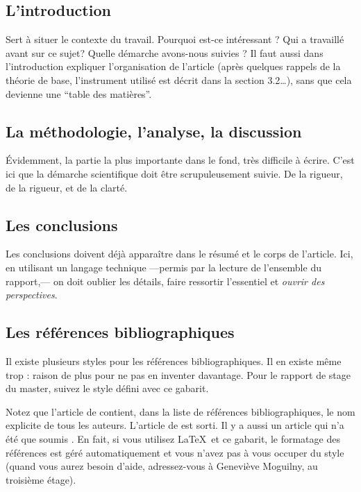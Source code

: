 \documentclass{ipgpmaster}
\begin{document}
\subsection{L'introduction}

Sert à situer le contexte du travail. Pourquoi est-ce intéressant ? 
Qui a travaillé avant sur ce sujet? Quelle démarche avons-nous suivies ?
Il faut aussi dans l'introduction expliquer l'organisation de l'article 
(après quelques rappels de la théorie de base,  l'instrument 
utilisé est décrit dans la section 3.2\dots), sans que cela 
devienne une ``table des matières''.


\subsection{La méthodologie, l'analyse, la discussion}

Évidemment, la partie la plus importante dans le fond, très difficile 
à écrire. C'est ici que la démarche scientifique doit être 
scrupuleusement suivie. De la rigueur, de la rigueur, et de la clarté.


\subsection{Les conclusions}

Les conclusions doivent déjà apparaître dans le résumé et le 
corps de l'article. Ici, en utilisant un langage technique ---permis par la
lecture de l'ensemble du rapport,--- on doit oublier les détails, faire ressortir l'essentiel et \emph{ouvrir des perspectives\/}.


\subsection{Les références bibliographiques}

Il existe plusieurs styles pour les références bibliographiques. 
Il en existe même trop : raison de plus pour ne pas en inventer davantage. 
Pour le rapport de stage du master, suivez le style 
défini avec ce gabarit. 

Notez que l'article de \cite{cao1990simultaneous} contient, dans 
la liste de références bi\-blio\-gra\-phiques, le nom explicite de tous 
les auteurs.
L'article de \cite{crase1992nonlinear} est sorti.  
 Il y a aussi un article qui n'a été que 
soumis \parencite{frezatsoumis}. 
En fait, si 
vous utilisez \LaTeX\ et ce gabarit, le formatage des références est géré 
automatiquement et vous n'avez pas à vous occuper du style 
(quand vous aurez besoin d'aide, adressez-vous à Geneviève Moguilny,
au troisième étage). 
\end{document}
